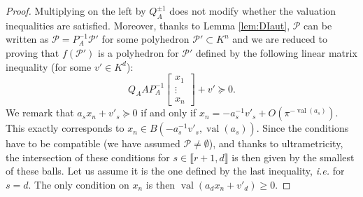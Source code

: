 \documentclass[sigconf]{acmart}
\newcommand{\PP}{\mathcal{P}}
\DeclareMathOperator{\val}{val}
\begin{document}
\begin{proof}
Multiplying on the left by $Q_A^{\pm 1}$ does not
modify whether the valuation inequalities are satisfied.
Moreover, thanks to Lemma \ref{lem:DIaut},
$\PP$ can be written as
$\PP = P_A^{-1} \PP'$ for some polyhedron $\PP' \subset K^n$
and we are reduced to proving that
$f(\PP')$ is a polyhedron for $\PP'$
defined by the following linear matrix inequality (for some $v' \in K^d$):
\[
Q_A A P_A^{-1}
\begin{bmatrix}
  x_1 \\ \vdots \\ x_n
\end{bmatrix}
+ v' \succeq 0.
\]
We remark that 
$a_s x_n + v'_s \succeq 0$
if and only if $x_n = -a_s^{-1} v'_s + O(\pi^{- \val(a_s)}).$
This exactly corresponds to $x_n \in B(-a_s^{-1} v'_s,\val(a_s)).$
Since the conditions have to be compatible (we have assumed
$\PP\neq\emptyset$), and thanks to ultrametricity,  
the intersection of these conditions for $s \in \llbracket r+1, d \rrbracket$
is then given by the smallest of these balls.
Let us assume it is the one defined by the last inequality, \textit{i.e.} for $s = d.$
The only condition on $x_n$
is then $\val(a_dx_n + v'_d) \geq 0.$


\end{proof}
\end{document}

